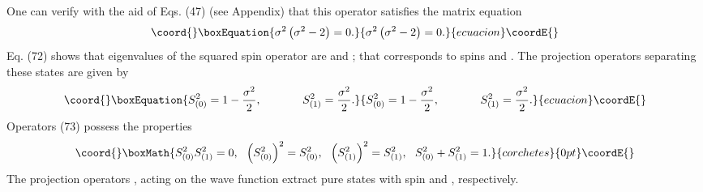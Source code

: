 \documentclass[a4paper,12pt]{article}
\begin{document}
One can verify with the aid of Eqs. (47) (see Appendix) that this
operator satisfies the matrix equation
\begin{equation}\coord{}\boxEquation{
\sigma ^2\left( \sigma ^2-2\right) =0 . \label{72}
}{
\sigma ^2\left( \sigma ^2-2\right) =0 . }{ecuacion}\coordE{}\end{equation}
Eq. (72) shows that eigenvalues of the squared spin operator
\coordHE{} are \coordHE{} and \coordHE{}; that corresponds to
spins \coordHE{} and \coordHE{}. The projection operators separating these
states are given by
\begin{equation}\coord{}\boxEquation{
S_{(0)}^2=1-\frac{\sigma ^2}2
,\hspace{0.5in}S_{(1)}^2=\frac{\sigma ^2}2 .\label{73}
}{
S_{(0)}^2=1-\frac{\sigma ^2}2
,\hspace{0.5in}S_{(1)}^2=\frac{\sigma ^2}2 .}{ecuacion}\coordE{}\end{equation}
Operators (73) possess the properties
\[\coord{}\boxMath{
S_{(0)}^2S_{(1)}^2=0 ,~~\left( S_{(0)}^2\right) ^2=S_{(0)}^2 ,
~~\left( S_{(1)}^2\right) ^2=S_{(1)}^2 ,~~ S_{(0)}^2+S_{(1)}^2= 1
.
}{corchetes}{0pt}\coordE{}\]
The projection operators \coordHE{}, \coordHE{} acting on the
wave function extract pure states with spin \coordHE{} and \coordHE{},
respectively.
\end{document}
